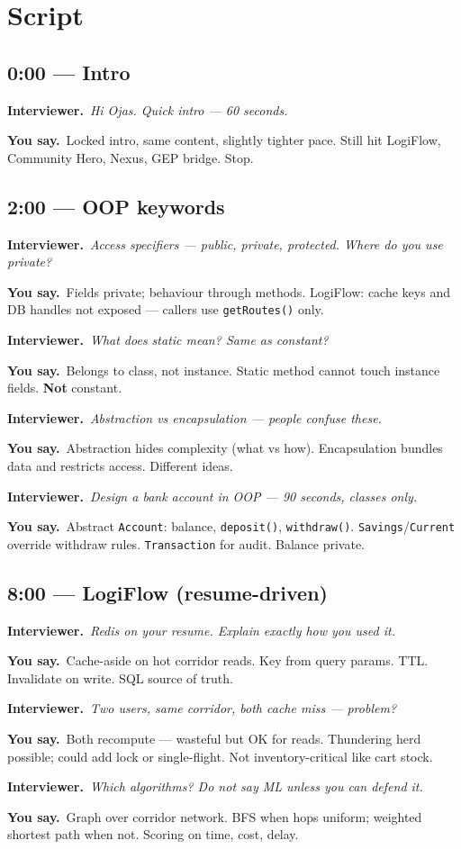 \documentclass[11pt,a4paper]{article}
\newcommand{\IV}[1]{\par\vspace{4pt}\noindent\textcolor{qcol}{\textbf{Interviewer.}}~\textit{#1}\par}
\newcommand{\You}[1]{%
  \par\vspace{2pt}%
  \noindent\colorbox{youbg}{%
    \parbox{\dimexpr\textwidth-2\fboxsep}{\vspace{3pt}\textcolor{you}{\textbf{\small You say.}}~#1\vspace{3pt}}%
  }\par}
\begin{document}
\section{Script}

\subsection*{0:00 --- Intro}
\IV{Hi Ojas. Quick intro --- 60 seconds.}
\You{Locked intro, same content, slightly tighter pace. Still hit LogiFlow, Community Hero, Nexus, GEP bridge. Stop.}

\subsection*{2:00 --- OOP keywords}
\IV{Access specifiers --- public, private, protected. Where do you use private?}
\You{Fields private; behaviour through methods. LogiFlow: cache keys and DB handles not exposed --- callers use \texttt{getRoutes()} only.}

\IV{What does static mean? Same as constant?}
\You{Belongs to class, not instance. Static method cannot touch instance fields. \textbf{Not} constant.}

\IV{Abstraction vs encapsulation --- people confuse these.}
\You{Abstraction hides complexity (what vs how). Encapsulation bundles data and restricts access. Different ideas.}

\IV{Design a bank account in OOP --- 90 seconds, classes only.}
\You{Abstract \texttt{Account}: balance, \texttt{deposit()}, \texttt{withdraw()}. \texttt{Savings}/\texttt{Current} override withdraw rules. \texttt{Transaction} for audit. Balance private.}

\subsection*{8:00 --- LogiFlow (resume-driven)}
\IV{Redis on your resume. Explain exactly how you used it.}
\You{Cache-aside on hot corridor reads. Key from query params. TTL. Invalidate on write. SQL source of truth.}

\IV{Two users, same corridor, both cache miss --- problem?}
\You{Both recompute --- wasteful but OK for reads. Thundering herd possible; could add lock or single-flight. Not inventory-critical like cart stock.}

\IV{Which algorithms? Do not say ML unless you can defend it.}
\You{Graph over corridor network. BFS when hops uniform; weighted shortest path when not. Scoring on time, cost, delay.}
\end{document}

